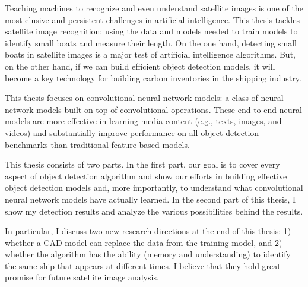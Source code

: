 

Teaching machines to recognize and even understand satellite images is one of the most elusive and persistent challenges in artiﬁcial intelligence. This thesis tackles satellite image recognition: using the data and models needed to train models to identify small boats and measure their length. On the one hand, detecting small boats in satellite images is a major test of artiﬁcial intelligence algorithms. But, on the other hand, if we can build efﬁcient object detection models, it will become a key technology for building carbon inventories in the shipping industry.

This thesis focuses on convolutional neural network models: a class of neural network models built on top of convolutional operations. These end-to-end neural models are more effective in learning media content (e.g., texts, images, and videos) and substantially improve performance on all object detection benchmarks than traditional feature-based models.

This thesis consists of two parts. In the ﬁrst part, our goal is to cover every aspect of object detection algorithm and show our efforts in building effective object detection models and, more importantly, to understand what convolutional neural network models have actually learned. In the second part of this thesis, I show my detection results and analyze the various possibilities behind the results.

In particular, I discuss two new research directions at the end of this thesis: 1) whether a CAD model can replace the data from the training model, and 2) whether the algorithm has the ability (memory and understanding) to identify the same ship that appears at different times. I believe that they hold great promise for future satellite image analysis.